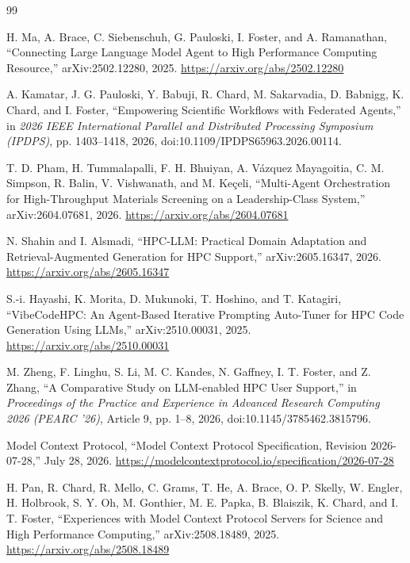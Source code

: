 \documentclass[11pt]{article}
\begin{document}
\begin{thebibliography}{99}

H. Ma, A. Brace, C. Siebenschuh, G. Pauloski, I. Foster, and A. Ramanathan,
``Connecting Large Language Model Agent to High Performance Computing Resource,''
arXiv:2502.12280, 2025.
\url{https://arxiv.org/abs/2502.12280}

A. Kamatar, J. G. Pauloski, Y. Babuji, R. Chard, M. Sakarvadia, D. Babnigg,
K. Chard, and I. Foster,
``Empowering Scientific Workflows with Federated Agents,''
in \textit{2026 IEEE International Parallel and Distributed Processing Symposium (IPDPS)},
pp. 1403--1418, 2026, doi:10.1109/IPDPS65963.2026.00114.

T. D. Pham, H. Tummalapalli, F. H. Bhuiyan, A. V{\'a}zquez Mayagoitia,
C. M. Simpson, R. Balin, V. Vishwanath, and M. Ke{\c{c}}eli,
``Multi-Agent Orchestration for High-Throughput Materials Screening on a Leadership-Class System,''
arXiv:2604.07681, 2026.
\url{https://arxiv.org/abs/2604.07681}

N. Shahin and I. Alsmadi,
``HPC-LLM: Practical Domain Adaptation and Retrieval-Augmented Generation for HPC Support,''
arXiv:2605.16347, 2026.
\url{https://arxiv.org/abs/2605.16347}

S.-i. Hayashi, K. Morita, D. Mukunoki, T. Hoshino, and T. Katagiri,
``VibeCodeHPC: An Agent-Based Iterative Prompting Auto-Tuner for HPC Code Generation Using LLMs,''
arXiv:2510.00031, 2025.
\url{https://arxiv.org/abs/2510.00031}

M. Zheng, F. Linghu, S. Li, M. C. Kandes, N. Gaffney, I. T. Foster, and Z. Zhang,
``A Comparative Study on LLM-enabled HPC User Support,''
in \textit{Proceedings of the Practice and Experience in Advanced Research Computing 2026 (PEARC '26)},
Article 9, pp. 1--8, 2026, doi:10.1145/3785462.3815796.

Model Context Protocol,
``Model Context Protocol Specification, Revision 2026-07-28,''
July 28, 2026.
\url{https://modelcontextprotocol.io/specification/2026-07-28}

H. Pan, R. Chard, R. Mello, C. Grams, T. He, A. Brace, O. P. Skelly,
W. Engler, H. Holbrook, S. Y. Oh, M. Gonthier, M. E. Papka, B. Blaiszik,
K. Chard, and I. T. Foster,
``Experiences with Model Context Protocol Servers for Science and High Performance Computing,''
arXiv:2508.18489, 2025.
\url{https://arxiv.org/abs/2508.18489}


\end{thebibliography}
\end{document}
